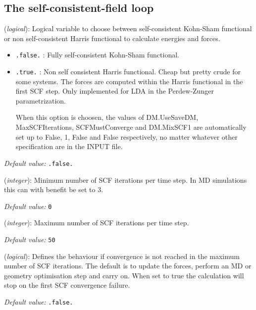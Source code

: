 \documentclass[11pt]{article}
\begin{document}
\vspace{5pt}
\subsection{The self-consistent-field loop}

\begin{description}
\itemsep 10pt
\parsep 0pt

\item[{\bf Harris\_functional}] ({\it logical}):
Logical variable to choose between self-consistent Kohn-Sham functional or
 non self-consistent Harris functional to calculate energies and forces.
\begin{itemize}
\item {\tt .false.} : Fully self-consistent Kohn-Sham functional.
\item {\tt .true.} : Non self consistent Harris functional. Cheap but
pretty crude for some systems. The forces are computed within the
Harris functional in the first SCF step. Only implemented for LDA in
the Perdew-Zunger parametrization.

When this option is choosen, the values of DM.UseSaveDM,
MaxSCFIterations, SCFMustConverge and DM.MixSCF1 are automatically set
up to False, 1, False and False respectively, no matter whatever other
specification are in the INPUT file.
\end{itemize}

{\it Default value:} {\tt .false.}

\item[{\bf MinSCFIterations}] ({\it integer}):
Minimum number of SCF iterations per time step. In MD simulations
this can with benefit be set to 3.

{\it Default value:} {\tt 0}

\item[{\bf MaxSCFIterations}] ({\it integer}):
Maximum number of SCF iterations per time step.

{\it Default value:} {\tt 50}

\item[{\bf SCFMustConverge}] ({\it logical}):
Defines the behaviour if convergence is not reached in the maximum
number of SCF iterations. The default is to update the forces, perform
an MD or geometry optimisation step and carry on. When set to true
the calculation will stop on the first SCF convergence failure.

{\it Default value:} {\tt .false.}

\end{description}
\end{document}
